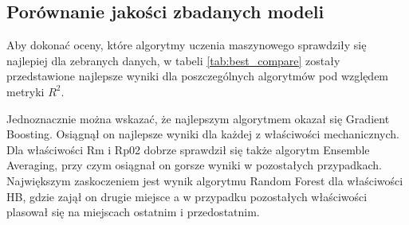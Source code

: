 \subsection{Porównanie jakości zbadanych modeli}\label{sec:comp-eval}
Aby dokonać oceny, które algorytmy uczenia maszynowego sprawdziły się najlepiej dla zebranych danych, w tabeli \ref{tab:best_compare} zostały przedstawione najlepsze wyniki dla poszczególnych algorytmów pod względem metryki $R^{2}$. 

Jednoznacznie można wskazać, że najlepszym algorytmem okazał się Gradient Boosting.  Osiągnął on najlepsze wyniki dla każdej z właściwości mechanicznych. Dla właściwości Rm i Rp02 dobrze sprawdził się także algorytm Ensemble Averaging, przy czym osiągnał on gorsze wyniki w pozostałych przypadkach. Największym zaskoczeniem jest wynik algorytmu Random Forest dla właściwości HB, gdzie zajął on drugie miejsce a w przypadku pozostałych właściwości plasował się na miejscach ostatnim i przedostatnim.


